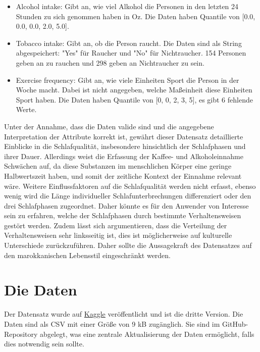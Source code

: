 \documentclass[usegeometry=true]{scrartcl}
\begin{document}
\begin{itemize}
 \item Alcohol intake: Gibt an, wie viel Alkohol die Personen in den letzten 24 Stunden zu sich genommen haben in Oz. Die Daten haben Quantile von [0.0, 0.0, 0.0, 2.0, 5.0].
 \item Tobacco intake: Gibt an, ob die Person raucht. Die Daten sind als String abgespeichert: "Yes" für Raucher und "No" für Nichtraucher. 154 Personen geben an zu rauchen und 298 geben an Nichtraucher zu sein.
 \item Exercise frequency: Gibt an, wie viele Einheiten Sport die Person in der Woche macht. Dabei ist nicht angegeben, welche Maßeinheit diese Einheiten Sport haben. Die Daten haben Quantile von [0, 0, 2, 3, 5], es gibt 6 fehlende Werte.
\end{itemize}

Unter der Annahme, dass die Daten valide sind und die angegebene Interpretation der Attribute korrekt ist, gewährt dieser Datensatz detaillierte Einblicke in die Schlafqualität, insbesondere hinsichtlich der Schlafphasen und ihrer Dauer. Allerdings weist die Erfassung der Kaffee- und Alkoholeinnahme Schwächen auf, da diese Substanzen im menschlichen Körper eine geringe Halbwertszeit haben, und somit der zeitliche Kontext der Einnahme relevant wäre. Weitere Einflussfaktoren auf die Schlafqualität werden nicht erfasst, ebenso wenig wird die Länge individueller Schlafunterbrechungen differenziert oder den drei Schlafphasen zugeordnet. Daher könnte es für den Anwender von Interesse sein zu erfahren, welche der Schlafphasen durch bestimmte Verhaltensweisen gestört werden. Zudem lässt sich argumentieren, dass die Verteilung der Verhaltensweisen sehr linksseitig ist, dies ist möglicherweise auf kulturelle Unterschiede zurückzuführen. Daher sollte die Aussagekraft des Datensatzes auf den marokkanischen Lebensstil eingeschränkt werden.
\section{Die Daten}
  Der Datensatz wurde auf \href{https://www.kaggle.com/datasets/equilibriumm/sleep-efficiency/data}{Kaggle} veröffentlicht und ist die dritte Version. Die Daten sind als CSV mit einer Größe von 9 kB zugänglich. Sie sind im GitHub-Repository abgelegt, was eine zentrale Aktualisierung der Daten ermöglicht, falls dies notwendig sein sollte.
\end{document}
